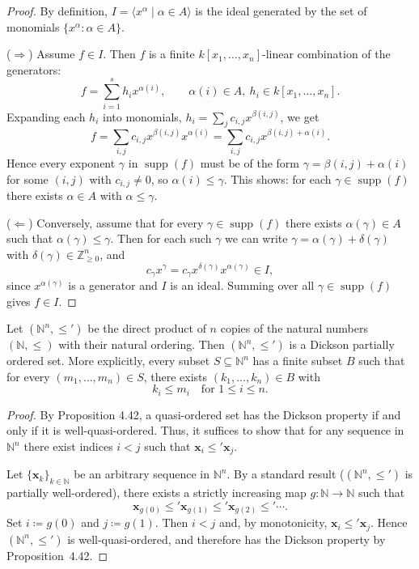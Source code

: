 \begin{proof}
  \mathlibok
  By definition, $I=\langle x^\alpha\mid \alpha\in A\rangle$ is the ideal generated by the set of monomials $\{x^\alpha:\alpha\in A\}$.

  ($\Rightarrow$)
  Assume $f\in I$. Then $f$ is a finite $k[x_1,\dots,x_n]$-linear combination of the generators:
  \[
    f=\sum_{i=1}^s h_i x^{\alpha(i)},\qquad \alpha(i)\in A,\ h_i\in k[x_1,\dots,x_n].
  \]
  Expanding each $h_i$ into monomials,
  $h_i=\sum_j c_{i,j}x^{\beta(i,j)}$, we get
  \[
    f=\sum_{i,j} c_{i,j} x^{\beta(i,j)}x^{\alpha(i)}
      =\sum_{i,j} c_{i,j} x^{\beta(i,j)+\alpha(i)}.
  \]
  Hence every exponent $\gamma$ in $\operatorname{supp}(f)$ must be of the form
  $\gamma=\beta(i,j)+\alpha(i)$ for some $(i,j)$ with $c_{i,j}\neq 0$,
  so $\alpha(i)\le\gamma$.
  This shows: for each $\gamma\in\operatorname{supp}(f)$ there exists $\alpha\in A$ with $\alpha\le\gamma$.

  ($\Leftarrow$)
  Conversely, assume that for every $\gamma\in\operatorname{supp}(f)$ there exists $\alpha(\gamma)\in A$ such that $\alpha(\gamma)\le\gamma$.
  Then for each such $\gamma$ we can write $\gamma=\alpha(\gamma)+\delta(\gamma)$ with $\delta(\gamma)\in\mathbb Z_{\ge 0}^n$, and
  \[
    c_\gamma x^\gamma = c_\gamma x^{\delta(\gamma)}x^{\alpha(\gamma)} \in I,
  \]
  since $x^{\alpha(\gamma)}$ is a generator and $I$ is an ideal.
  Summing over all $\gamma\in\operatorname{supp}(f)$ gives $f\in I$.
\end{proof}

\begin{theorem}\label{thm:Dickson} %
    \leanok 
    Let $(\mathbb{N}^n, \le')$ be the direct product of $n$ copies of the natural numbers $(\mathbb{N}, \le)$ with their natural ordering. 
    Then $(\mathbb{N}^n, \le')$ is a Dickson partially ordered set. 
    More explicitly, every subset $S \subseteq \mathbb{N}^n$ has a finite subset $B$ such that for every $(m_1, \dots, m_n) \in S$, there exists $(k_1, \dots, k_n) \in B$ with
    \[
    k_i \le m_i \quad \text{for } 1 \le i \le n.
    \]
\end{theorem}
\begin{proof}
    \leanok 
    By Proposition 4.42, a quasi-ordered set has the Dickson property if and only if it is well-quasi-ordered.
    Thus, it suffices to show that for any sequence in $\mathbb{N}^n$ there exist indices $i<j$ such that
    $\mathbf{x}_i \le' \mathbf{x}_j$.

    Let $\{\mathbf{x}_k\}_{k\in\mathbb{N}}$ be an arbitrary sequence in $\mathbb{N}^n$.
    By a standard result ($(\mathbb{N}^n,\le')$ is partially well-ordered),
    there exists a strictly increasing map $g:\mathbb{N}\to\mathbb{N}$ such that
    \[
    \mathbf{x}_{g(0)} \le' \mathbf{x}_{g(1)} \le' \mathbf{x}_{g(2)} \le' \cdots .
    \]
    Set $i \coloneqq g(0)$ and $j \coloneqq g(1)$. Then $i<j$ and, by monotonicity,
    $\mathbf{x}_i \le' \mathbf{x}_j$. Hence $(\mathbb{N}^n,\le')$ is well-quasi-ordered, and therefore
    has the Dickson property by Proposition~4.42.
\end{proof}

